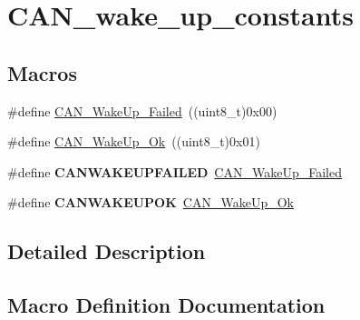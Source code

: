 \hypertarget{group___c_a_n__wake__up__constants}{}\section{C\+A\+N\+\_\+wake\+\_\+up\+\_\+constants}
\label{group___c_a_n__wake__up__constants}
\subsection*{Macros}
\begin{DoxyCompactItemize}
\item 
\#define \hyperlink{group___c_a_n__wake__up__constants_ga837fd7ad47fee78e43a186544e2b390b}{C\+A\+N\+\_\+\+Wake\+Up\+\_\+\+Failed}~((uint8\+\_\+t)0x00)
\item 
\#define \hyperlink{group___c_a_n__wake__up__constants_ga152e4935cf85bdfb803eb36b656cd690}{C\+A\+N\+\_\+\+Wake\+Up\+\_\+\+Ok}~((uint8\+\_\+t)0x01)
\item 
\hypertarget{group___c_a_n__wake__up__constants_ga0de3b0e2c544d9fa772b646e331e51b1}{}\#define {\bfseries C\+A\+N\+W\+A\+K\+E\+U\+P\+F\+A\+I\+L\+E\+D}~\hyperlink{group___c_a_n__wake__up__constants_ga837fd7ad47fee78e43a186544e2b390b}{C\+A\+N\+\_\+\+Wake\+Up\+\_\+\+Failed}\label{group___c_a_n__wake__up__constants_ga0de3b0e2c544d9fa772b646e331e51b1}

\item 
\hypertarget{group___c_a_n__wake__up__constants_gafed6ab4dbb00c9d63f6a7cdf323f33ef}{}\#define {\bfseries C\+A\+N\+W\+A\+K\+E\+U\+P\+O\+K}~\hyperlink{group___c_a_n__wake__up__constants_ga152e4935cf85bdfb803eb36b656cd690}{C\+A\+N\+\_\+\+Wake\+Up\+\_\+\+Ok}\label{group___c_a_n__wake__up__constants_gafed6ab4dbb00c9d63f6a7cdf323f33ef}

\end{DoxyCompactItemize}


\subsection{Detailed Description}


\subsection{Macro Definition Documentation}
\hypertarget{group___c_a_n__wake__up__constants_ga837fd7ad47fee78e43a186544e2b390b}{}
